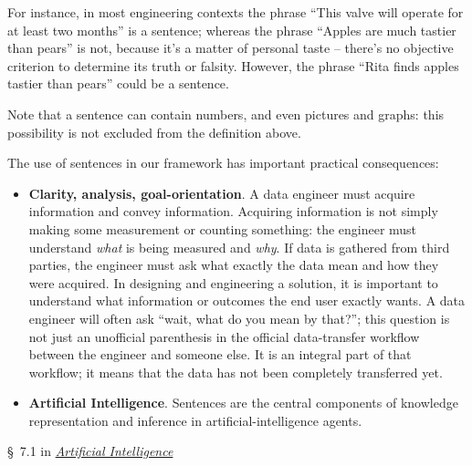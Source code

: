 \documentclass[
  a4paper,
  DIV=11,
  numbers=noendperiod,
  oneside]{scrreprt}
\begin{document}
For instance, in most engineering contexts the phrase ``This valve will
operate for at least two months'' is a sentence; whereas the phrase
``Apples are much tastier than pears'' is not, because it's a matter of
personal taste -- there's no objective criterion to determine its truth
or falsity. However, the phrase ``Rita finds apples tastier than pears''
could be a sentence.

Note that a sentence can contain numbers, and even pictures and graphs:
this possibility is not excluded from the definition above.

The use of sentences in our framework has important practical
consequences:

\begin{itemize}
\item
  \textbf{Clarity, analysis, goal-orientation}. A data engineer must
  acquire information and convey information. Acquiring information is
  not simply making some measurement or counting something: the engineer
  must understand \emph{what} is being measured and \emph{why}. If data
  is gathered from third parties, the engineer must ask what exactly the
  data mean and how they were acquired. In designing and engineering a
  solution, it is important to understand what information or outcomes
  the end user exactly wants. A data engineer will often ask ``wait,
  what do you mean by that?''; this question is not just an unofficial
  parenthesis in the official data-transfer workflow between the
  engineer and someone else. It is an integral part of that workflow; it
  means that the data has not been completely transferred yet.
\item
  \textbf{Artificial Intelligence}. Sentences are the central components
  of knowledge representation and inference in artificial-intelligence
  agents.
\end{itemize}

\begin{tcolorbox}[enhanced jigsaw, bottomrule=.15mm, leftrule=.75mm, opacitybacktitle=0.6, breakable, toptitle=1mm, coltitle=black, title={\faIcon{book-open} Reading}, rightrule=.15mm, left=2mm, colframe=quarto-callout-caution-color-frame, bottomtitle=1mm, arc=.35mm, titlerule=0mm, toprule=.15mm, opacityback=0, colback=white, colbacktitle=quarto-callout-caution-color!10!white]

§~7.1 in
\href{https://hvl.instructure.com/courses/25074/modules/items/660089}{\emph{Artificial
Intelligence}}

\end{tcolorbox}
\end{document}
